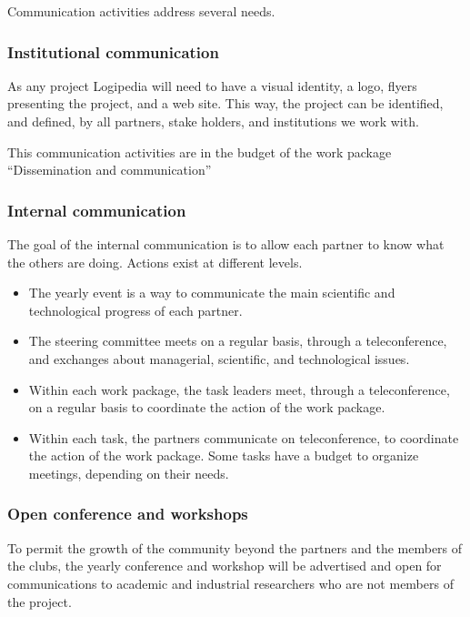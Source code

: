 Communication activities address several needs. 

\subsubsection*{Institutional communication}

As any project Logipedia will need to have a visual identity, a logo,
flyers presenting the project, and a web site. 
This way, the project can be identified, and defined, by all partners, 
stake holders, and institutions we work with. 

This communication activities are in the budget of the work package
``Dissemination and communication''

\subsubsection*{Internal communication}

The goal of the internal communication is to allow each partner to
know what the others are doing. Actions exist at different levels.

\begin{itemize}
\item The yearly event is a way to communicate the main scientific and
  technological progress of each partner.

\item The steering committee meets on a regular basis, through a
  teleconference, and exchanges about managerial, scientific, and
  technological issues.

\item Within each work package, the task leaders meet, through a
  teleconference, on a regular basis to coordinate the action of the
  work package.

\item Within each task, the partners communicate on teleconference, to
  coordinate the action of the work package. Some tasks have a budget
  to organize meetings, depending on their needs.
\end{itemize}

\subsubsection*{Open conference and workshops}

To permit the growth of the community beyond the partners and the
members of the clubs, the yearly conference and workshop will be
advertised and open for communications to academic and industrial
researchers who are not members of the project.

